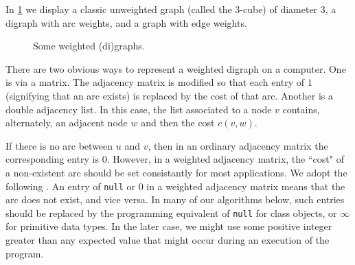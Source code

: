 In \cref{fig:graphExample5} we display a classic unweighted graph
(called the $3$-cube) of diameter $3$, a digraph with arc weights, and a
graph with edge weights.

\begin{figure}
\centerline{}

\caption{Some weighted (di)graphs.}
\label{fig:graphExample5}
\end{figure}

There are two obvious ways to represent a weighted digraph on a
computer. One is via a matrix. The adjacency matrix is modified so that
each entry of $1$ (signifying that an arc exists) is replaced by the
cost of that arc. Another is a double adjacency list. In this case, the
list associated to a node $v$ contains, alternately, an adjacent node
$w$ and then the cost $c(v, w)$.  

If there is no arc between $u$ and $v$, then in an ordinary adjacency
matrix the corresponding entry is $0$. However, in a weighted adjacency
matrix, the ``cost" of a non-existent arc should be set consistantly 
for most applications. We adopt the following . 
An entry of \verb|null| or $0$ in a weighted 
adjacency matrix
means that the arc does not exist, and vice versa. In many of our
algorithms below, such entries should be replaced by the programming
equivalent of \verb|null| for class objects, or $\infty$ for 
primitive data types.  In the later case, we might use some positive 
integer greater than any expected value that might occur during
an execution of the program. 


